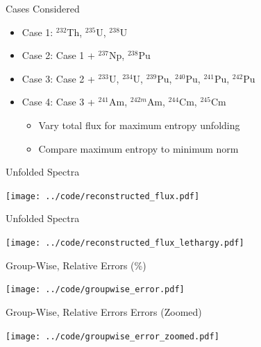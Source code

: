 \documentclass[fleqn]{beamer}
\begin{document}
    
    \begin{frame}{Cases Considered}
      \begin{itemize}
      \item Case 1: ${}^{232}$Th, ${}^{235}$U, ${}^{238}$U
      \item Case 2: Case 1 + ${}^{237}$Np,  ${}^{238}$Pu
      \item Case 3: Case 2 + ${}^{233}$U, ${}^{234}$U, 
                    ${}^{239}$Pu, ${}^{240}$Pu, ${}^{241}$Pu, ${}^{242}$Pu
      \item Case 4: Case 3 +
                    ${}^{241}$Am, ${}^{242m}$Am,
                    ${}^{244}$Cm, ${}^{245}$Cm 
        \begin{itemize}
          \item Vary total flux for maximum entropy unfolding
          \item Compare maximum entropy to minimum norm
        \end{itemize}
      \end{itemize}
    \end{frame}
    
    \begin{frame}{Unfolded Spectra}
         \begin{center}
             \texttt{[image: ../code/reconstructed\_flux.pdf]}
         \end{center}
    \end{frame}

    \begin{frame}{Unfolded Spectra}
         \begin{center}
             \texttt{[image: ../code/reconstructed\_flux\_lethargy.pdf]}
         \end{center}
    \end{frame}
    
    \begin{frame}{Group-Wise, Relative Errors (\%)}
         \begin{center}
             \texttt{[image: ../code/groupwise\_error.pdf]}
         \end{center}
    \end{frame}
    
    \begin{frame}{Group-Wise, Relative Errors  Errors (Zoomed)}
         \begin{center}
             \texttt{[image: ../code/groupwise\_error\_zoomed.pdf]}
         \end{center}
    \end{frame}
    
\end{document}
